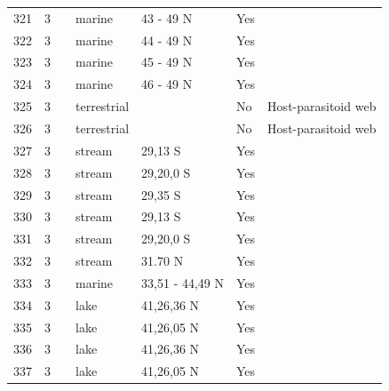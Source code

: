 \documentclass[12pt]{article}
\begin{document}
\begin{landscape}
\begin{table}[h!]
{\begin{tabular}{p{2.8cm}p{1.3cm}p{5.5cm}p{2.2cm}p{2.5cm}lp{3.5cm}}
        321   & 3 & \cite{Ruzicka2012}    & marine & 43 - 49 N & Yes   &       \\
        322   & 3 & \cite{Ruzicka2012}    & marine & 44 - 49 N & Yes   &       \\
        323   & 3 & \cite{Ruzicka2012}    & marine & 45 - 49 N & Yes   &       \\
        324   & 3 & \cite{Ruzicka2012}    & marine & 46 - 49 N & Yes   &       \\
        325   & 3 & \cite{Lewis2002}  & terrestrial &       & No    & Host-parasitoid web \\
        326   & 3 & \cite{Lewis2002}  & terrestrial &       & No    & Host-parasitoid web \\
        327   & 3 & \cite{Kelleway2010}  & stream & 29,13 S & Yes   &       \\
        328   & 3 & \cite{Kelleway2010}  & stream & 29,20,0 S & Yes   &       \\
        329   & 3 & \cite{Kelleway2010}  & stream & 29,35 S & Yes   &       \\
        330   & 3 & \cite{Kelleway2010}  & stream & 29,13 S & Yes   &       \\
        331   & 3 & \cite{Kelleway2010}  & stream & 29,20,0 S & Yes   &       \\
        332   & 3 & \cite{Huang2008}  & stream & 31.70 N & Yes   &       \\
        333   & 3 & \cite{Link2002}    & marine & 33,51 - 44,49 N & Yes   &       \\
        334   & 3 & \cite{Alcorlo2001}  & lake  & 41,26,36 N & Yes   &       \\
        335   & 3 & \cite{Alcorlo2001}  & lake  & 41,26,05 N & Yes   &       \\
        336   & 3 & \cite{Alcorlo2001}  & lake  & 41,26,36 N & Yes   &       \\
        337   & 3 & \cite{Alcorlo2001}  & lake  & 41,26,05 N & Yes   &       \\
         \hline
      \end{tabular}}%
      \end{table}

        \newpage


\end{landscape}
\end{document}
